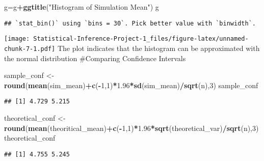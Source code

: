 \documentclass[
]{article}
\newenvironment{Shaded}{\begin{snugshade}}{\end{snugshade}}
\newcommand{\DecValTok}[1]{\textcolor[rgb]{0.00,0.00,0.81}{#1}}
\newcommand{\FloatTok}[1]{\textcolor[rgb]{0.00,0.00,0.81}{#1}}
\newcommand{\FunctionTok}[1]{\textcolor[rgb]{0.13,0.29,0.53}{\textbf{#1}}}
\newcommand{\NormalTok}[1]{#1}
\newcommand{\OtherTok}[1]{\textcolor[rgb]{0.56,0.35,0.01}{#1}}
\newcommand{\SpecialCharTok}[1]{\textcolor[rgb]{0.81,0.36,0.00}{\textbf{#1}}}
\newcommand{\StringTok}[1]{\textcolor[rgb]{0.31,0.60,0.02}{#1}}
\begin{document}
\begin{Shaded}
\begin{Highlighting}[]
\NormalTok{g}\OtherTok{=}\NormalTok{g}\SpecialCharTok{+}\FunctionTok{ggtitle}\NormalTok{(}\StringTok{"Histogram of Simulation Mean"}\NormalTok{)}
\NormalTok{g}
\end{Highlighting}
\end{Shaded}

\begin{verbatim}
## `stat_bin()` using `bins = 30`. Pick better value with `binwidth`.
\end{verbatim}

\texttt{[image: Statistical-Inference-Project-1\_files/figure-latex/unnamed-chunk-7-1.pdf]}
The plot indicates that the histogram can be approximated with the
normal distribution \#Comparing Confidence Intervals

\begin{Shaded}
\begin{Highlighting}[]
\NormalTok{sample\_conf }\OtherTok{\textless{}{-}} \FunctionTok{round}\NormalTok{(}\FunctionTok{mean}\NormalTok{(sim\_mean)}\SpecialCharTok{+}\FunctionTok{c}\NormalTok{(}\SpecialCharTok{{-}}\DecValTok{1}\NormalTok{,}\DecValTok{1}\NormalTok{)}\SpecialCharTok{*}\FloatTok{1.96}\SpecialCharTok{*}\FunctionTok{sd}\NormalTok{(sim\_mean)}\SpecialCharTok{/}\FunctionTok{sqrt}\NormalTok{(n),}\DecValTok{3}\NormalTok{)}
\NormalTok{sample\_conf}
\end{Highlighting}
\end{Shaded}

\begin{verbatim}
## [1] 4.729 5.215
\end{verbatim}

\begin{Shaded}
\begin{Highlighting}[]
\NormalTok{theoretical\_conf }\OtherTok{\textless{}{-}} \FunctionTok{round}\NormalTok{(}\FunctionTok{mean}\NormalTok{(theoritical\_mean)}\SpecialCharTok{+}\FunctionTok{c}\NormalTok{(}\SpecialCharTok{{-}}\DecValTok{1}\NormalTok{,}\DecValTok{1}\NormalTok{)}\SpecialCharTok{*}\FloatTok{1.96}\SpecialCharTok{*}\FunctionTok{sqrt}\NormalTok{(theoretical\_var)}\SpecialCharTok{/}\FunctionTok{sqrt}\NormalTok{(n),}\DecValTok{3}\NormalTok{)}
\NormalTok{theoretical\_conf}
\end{Highlighting}
\end{Shaded}

\begin{verbatim}
## [1] 4.755 5.245
\end{verbatim}
\end{document}
